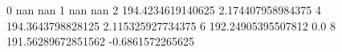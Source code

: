 0 nan nan
1 nan nan
2 194.4234619140625 2.174407958984375
4 194.3643798828125 2.115325927734375
6 192.24905395507812 0.0
8 191.56289672851562 -0.6861572265625

